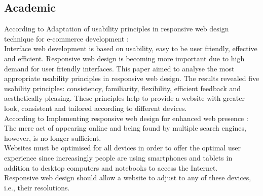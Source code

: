 \documentclass[12pt]{article}
\begin{document}
\subsection{Academic}
According to Adaptation of usability principles in responsive web design technique for e-commerce development \cite{majid2015adaptation}:\\
Interface web development is based on usability, easy to be user friendly, effective and efficient. Responsive web design is becoming more important due to high demand for user friendly interfaces. This paper aimed to analyse the most appropriate usability principles in responsive web design. The results revealed five usability principles: consistency, familiarity, flexibility, efficient feedback and aesthetically pleasing. These principles help to provide a website with greater look, consistent and tailored according to different devices.\\
According to Implementing responsive web design for enhanced web presence \cite{mohorovivcic2013implementing}:\\
The mere act of appearing online and being found by multiple search engines, however, is no longer sufficient.\\
Websites must be optimised for all devices in order to offer the optimal user experience since increasingly people are using smartphones and tablets in addition to desktop computers and notebooks to access the Internet.\\
Responsive web design should allow a website to adjust to any of these devices, i.e., their resolutions.
\end{document}
